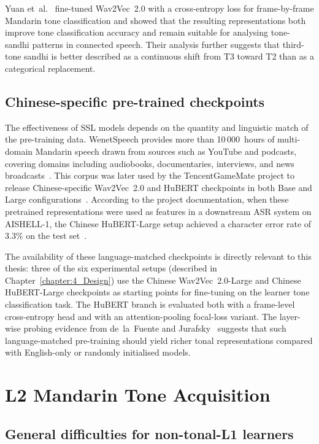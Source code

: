 Yuan et~al.~\cite{yuan2023} fine-tuned Wav2Vec~2.0 with a cross-entropy loss for frame-by-frame Mandarin tone classification and showed that the resulting representations both improve tone classification accuracy and remain suitable for analysing tone-sandhi patterns in connected speech. Their analysis further suggests that third-tone sandhi is better described as a continuous shift from T3 toward T2 than as a categorical replacement.

\subsection{Chinese-specific pre-trained checkpoints}

The effectiveness of SSL models depends on the quantity and linguistic match of the pre-training data. WenetSpeech provides more than 10\,000~hours of multi-domain Mandarin speech drawn from sources such as YouTube and podcasts, covering domains including audiobooks, documentaries, interviews, and news broadcasts~\cite{zhang2022wenetspeech}. This corpus was later used by the TencentGameMate project to release Chinese-specific Wav2Vec~2.0 and HuBERT checkpoints in both Base and Large configurations~\cite{tencentgamemate2022}. According to the project documentation, when these pretrained representations were used as features in a downstream ASR system on AISHELL-1, the Chinese HuBERT-Large setup achieved a character error rate of 3.3\% on the test set~\cite{tencentgamemate2022}.

The availability of these language-matched checkpoints is directly relevant to this thesis: three of the six experimental setups (described in Chapter~\ref{chapter:4_Design}) use the Chinese Wav2Vec~2.0-Large and Chinese HuBERT-Large checkpoints as starting points for fine-tuning on the learner tone classification task. The HuBERT branch is evaluated both with a frame-level cross-entropy head and with an attention-pooling focal-loss variant. The layer-wise probing evidence from de~la~Fuente and Jurafsky~\cite{delafuente2024} suggests that such language-matched pre-training should yield richer tonal representations compared with English-only or randomly initialised models.

\section{L2 Mandarin Tone Acquisition}
\label{sec:sota:l2}

\subsection{General difficulties for non-tonal-L1 learners}

